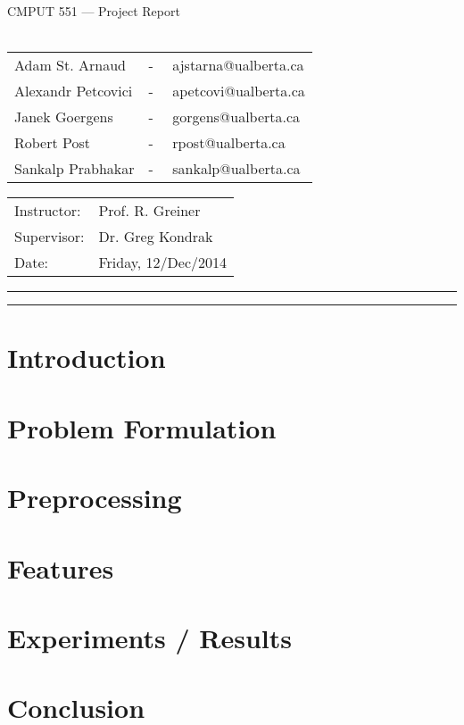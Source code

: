 \documentclass[12pt]{article}
\date{}
\begin{document}
\begin{center}\Large
        CMPUT 551 --- Project Report\\
        ~\\
        \small
        \begin{tabular}{@{}ll}
        Adam St. Arnaud &-~~ ajstarna@ualberta.ca\\
        Alexandr Petcovici &-~~ apetcovi@ualberta.ca\\
        Janek Goergens &-~~ gorgens@ualberta.ca\\
        Robert Post &-~~ rpost@ualberta.ca\\
        Sankalp Prabhakar &-~~ sankalp@ualberta.ca\\
        \end{tabular}
        
\end{center}
\begin{tabular}{@{}ll}
Instructor:     & Prof. R. Greiner \\
Supervisor: & Dr. Greg Kondrak\\
Date:       & Friday, 12/Dec/2014
\end{tabular}


\hrule\hrule

\vspace{0.20in}
\tableofcontents


\newpage
\section{Introduction} %
\label{sec:introduction}


\newpage
\section{Problem Formulation} %
\label{sec:problem_formulation}


\newpage
\section{Preprocessing} %
\label{sec:preprocessing}


\newpage
\section{Features} %
\label{sec:features}


\newpage
\section{Experiments / Results} %
\label{sec:experiments_results}


\newpage
\section{Conclusion} %
\label{sec:conclusion}

\end{document}
